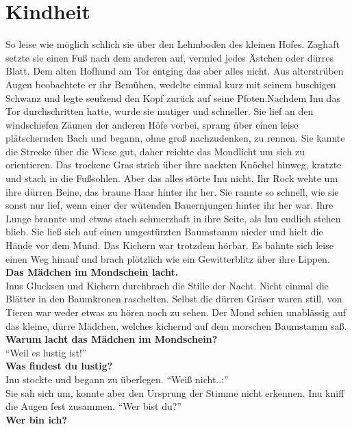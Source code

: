 \documentclass[a4paper,12pt]{book}
\begin{document}
\tableofcontents

\chapter{Kindheit}


  So leise wie möglich schlich sie über den Lehmboden des kleinen Hofes. Zaghaft setzte sie einen 
Fuß nach dem anderen auf, vermied jedes Ästchen oder dürres Blatt. Dem alten Hofhund am Tor entging 
das aber alles nicht. Aus alterstrüben Augen beobachtete er ihr Bemühen, wedelte einmal kurz mit 
seinem buschigen Schwanz und legte seufzend den Kopf zurück auf seine Pfoten.Nachdem Inu das Tor 
durchschritten hatte, wurde sie mutiger und schneller. Sie lief an den windschiefen Zäunen der 
anderen Höfe vorbei, sprang über einen leise plätschernden Bach und begann, ohne groß nachzudenken, 
zu rennen. Sie kannte die Strecke über die Wiese gut, daher reichte das Mondlicht um sich zu 
orientieren. Das trockene Gras strich über ihre nackten Knöchel hinweg, kratzte und stach in die 
Fußsohlen. Aber das alles störte Inu nicht. Ihr Rock wehte um ihre dürren Beine, das braune Haar 
hinter ihr her. Sie rannte so schnell, wie sie sonst nur lief, wenn einer der wütenden Bauernjungen 
hinter ihr her war. Ihre Lunge brannte und etwas stach schmerzhaft in ihre Seite, als Inu endlich 
stehen blieb. Sie ließ sich auf einen umgestürzten Baumstamm nieder und hielt die Hände vor dem 
Mund. Das Kichern war trotzdem hörbar. Es bahnte sich leise einen Weg hinauf und brach plötzlich wie 
ein Gewitterblitz über ihre Lippen.\\
\textbf{Das Mädchen im Mondschein lacht.}\\
Inus Glucksen und Kichern durchbrach die Stille der Nacht. Nicht einmal die Blätter in den 
Baumkronen raschelten. Selbst die dürren Gräser waren still, von Tieren war weder etwas zu hören 
noch zu sehen. Der Mond schien unablässig auf das kleine, dürre Mädchen, welches kichernd auf dem 
morschen Baumstamm saß.\\
\textbf{Warum lacht das Mädchen im Mondschein?}\\
``Weil es lustig ist!''\\
\textbf{Was findest du lustig?}\\
Inu stockte und begann zu überlegen. ``Weiß nicht..:''\\
Sie sah sich um, konnte aber den Ursprung der Stimme nicht erkennen. Inu kniff die Augen fest 
zusammen. ``Wer bist du?''\\
\textbf{Wer bin ich?}\\
\end{document}
